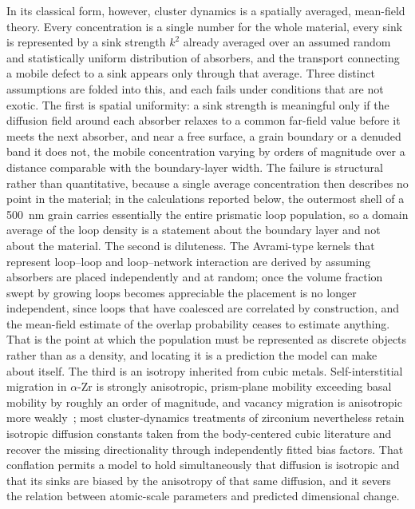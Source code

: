 In its classical form, however, cluster dynamics is a spatially averaged,
mean-field theory. Every concentration is a single number for the whole
material, every sink is represented by a sink strength $k^{2}$ already averaged
over an assumed random and statistically uniform distribution of absorbers, and
the transport connecting a mobile defect to a sink appears only through that
average. Three distinct assumptions are folded into this, and each fails under
conditions that are not exotic. The first is spatial uniformity: a sink strength
is meaningful only if the diffusion field around each absorber relaxes to a
common far-field value before it meets the next absorber, and near a free
surface, a grain boundary or a denuded band it does not, the mobile
concentration varying by orders of magnitude over a distance comparable with the
boundary-layer width. The failure is structural rather than quantitative,
because a single average concentration then describes no point in the material;
in the calculations reported below, the outermost shell of a
\SI{500}{\nano\meter} grain carries essentially the entire prismatic loop
population, so a domain average of the loop density is a statement about the
boundary layer and not about the material. The second is diluteness. The
Avrami-type kernels that represent loop--loop and loop--network interaction are
derived by assuming absorbers are placed independently and at random; once the
volume fraction swept by growing loops becomes appreciable the placement is no
longer independent, since loops that have coalesced are correlated by
construction, and the mean-field estimate of the overlap probability ceases to
estimate anything. That is the point at which the population must be represented
as discrete objects rather than as a density, and locating it is a prediction
the model can make about itself. The third is an isotropy inherited from cubic
metals. Self-interstitial migration in $\alpha$-Zr is strongly anisotropic,
prism-plane mobility exceeding basal mobility by roughly an order of magnitude,
and vacancy migration is anisotropic more
weakly~\citep{Christensen2015,PatraTrinkle2019}; most cluster-dynamics treatments
of zirconium nevertheless retain isotropic diffusion constants taken from the
body-centered cubic literature and recover the missing directionality through
independently fitted bias factors. That conflation permits a model to hold
simultaneously that diffusion is isotropic and that its sinks are biased by the
anisotropy of that same diffusion, and it severs the relation between
atomic-scale parameters and predicted dimensional change.

